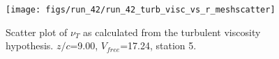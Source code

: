 \begin{figure}[H]
\centering
\texttt{[image: figs/run\_42/run\_42\_turb\_visc\_vs\_r\_meshscatter]}
\caption{Scatter plot of $\nu_T$ as calculated from the turbulent viscosity hypothesis. $z/c$=9.00, $V_{free}$=17.24, station 5.}
\label{fig:run_42_turb_visc_vs_r_meshscatter}
\end{figure}


